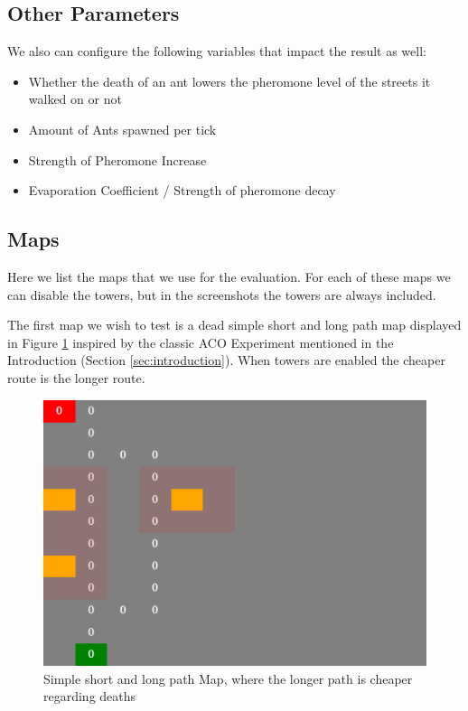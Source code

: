 \subsection{Other Parameters}
\label{sec:otherparamas}
We also can configure the following variables that impact the result as well:
\begin{itemize}
\item  Whether the death of an ant lowers the pheromone level of the streets it walked on or not
\item Amount of Ants spawned per tick
\item Strength of Pheromone Increase
\item Evaporation Coefficient / Strength of pheromone decay
\end{itemize}

\subsection{Maps}
\label{sec:testmaps}
Here we list the maps that we use for the evaluation. For each of these maps we can disable the towers, but in the screenshots the towers are always included.

The first map we wish to test is a dead simple short and long path map displayed in Figure \ref{fig:mapshortlong} inspired by the classic ACO Experiment mentioned in the Introduction (Section \ref{sec:introduction}). When towers are enabled the cheaper route is the longer route.

\begin{figure}[H]
  \centering
  \includegraphics[width=1\linewidth]{images/map_shortlong}
  \caption{Simple short and long path Map, where the longer path is cheaper regarding deaths}
  \label{fig:mapshortlong}
\end{figure}


